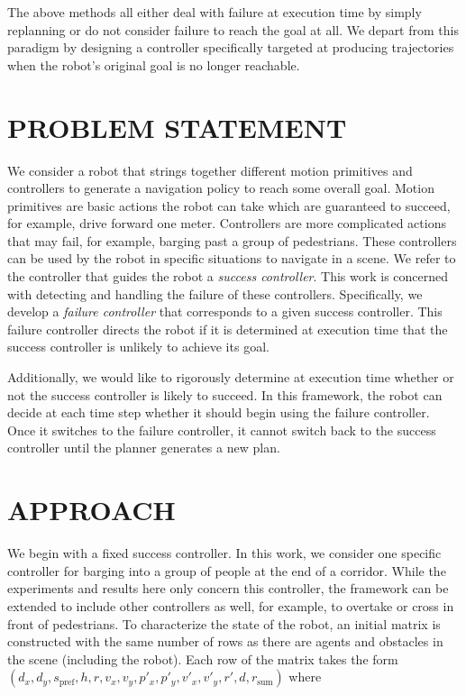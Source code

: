 \documentclass[letterpaper, 10 pt, conference]{ieeeconf}  %
\begin{document}
	The above methods all either deal with failure at execution time by simply replanning or do not consider failure to reach the goal at all. We depart from this paradigm by designing a controller specifically targeted at producing trajectories when the robot's original goal is no longer reachable.
	
\section{PROBLEM STATEMENT}\label{sec:problemstatement}
	We consider a robot that strings together different motion primitives and controllers to generate a navigation policy to reach some overall goal. Motion primitives are basic actions the robot can take which are guaranteed to succeed, for example, drive forward one meter. Controllers are more complicated actions that may fail, for example, barging past a group of pedestrians. These controllers can be used by the robot in specific situations to navigate in a scene. We refer to the controller that guides the robot a \textit{success controller}. This work is concerned with detecting and handling the failure of these controllers. Specifically, we develop a \textit{failure controller} that corresponds to a given success controller. This failure controller directs the robot if it is determined at execution time that the success controller is unlikely to achieve its goal. 
	
	Additionally, we would like to rigorously determine at execution time whether or not the success controller is likely to succeed. In this framework, the robot can decide at each time step whether it should begin using the failure controller. Once it switches to the failure controller, it cannot switch back to the success controller until the planner generates a new plan. 
		
\section{APPROACH}\label{sec:approach}
	We begin with a fixed success controller. In this work, we consider one specific controller for barging into a group of people at the end of a corridor. While the experiments and results here only concern this controller, the framework can be extended to include other controllers as well, for example, to overtake or cross in front of pedestrians. To characterize the state of the robot, an initial matrix is constructed with the same number of rows as there are agents and obstacles in the scene (including the robot). Each row of the matrix takes the form $(d_x, d_y, s_\text{pref}, h, r, v_x, v_y, p'_x, p'_y, v'_x, v'_y, r', d, r_\text{sum})$ where 
	
\end{document}
